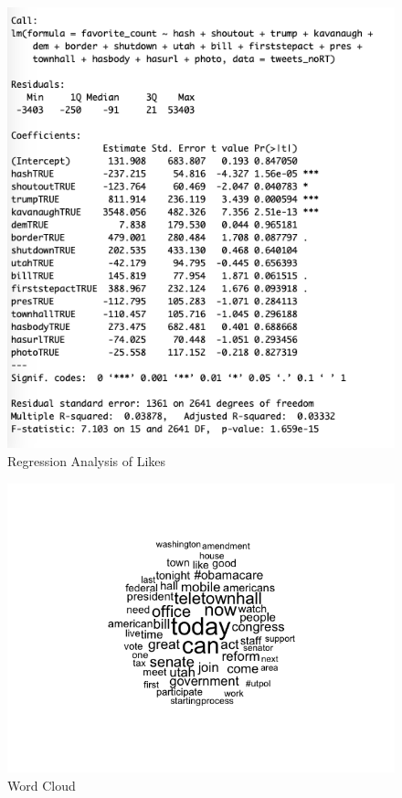\documentclass{article}
\begin{document}
\begin{figure}[h!]
\includegraphics[width =\textwidth]{image/regression_likes.png}
\caption{Regression Analysis of Likes}
\end{figure}
\begin{figure}[h!]
\includegraphics[width =\textwidth]{image/wordcloud.png}
\caption{Word Cloud}
\end{figure}
\end{document}
